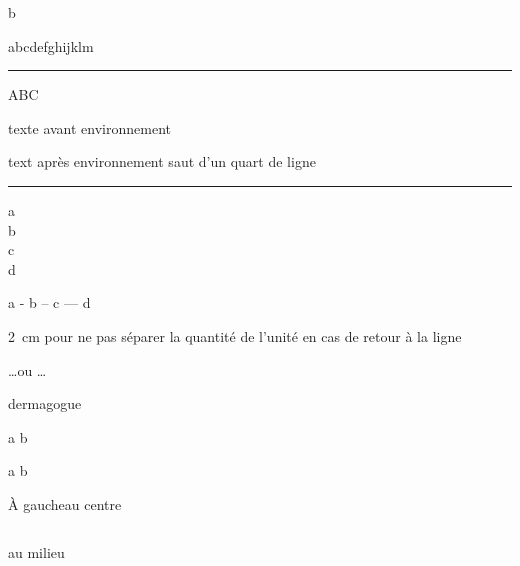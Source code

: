 \documentclass[12pt,a4paper,oneside,twocolumn]{article} %
\newlength{\Nom} %
\newcommand{\barre}[1]{
\settowidth{\Nom}{#1} #1\hspace{-\Nom} \rule[0.8ex]{\Nom}{1pt}}
\numberwithin{equation}{section}
\begin{document}

\textcircled{b}

\barre{abcdefghijklm} %



ABC

\begin{center} texte avant environnement \end{center} 
\smallskip text après environnement saut d’un quart de ligne

\rule{5cm}{1mm}

a \\ b \\[5mm] c \\[2cm] d

a - b -- c --- d

2~cm pour ne pas séparer la quantité de l'unité en cas de retour à la ligne

\ldots ou \dots

\og dermagogue  \fg

a \dotfill b

a \hfill b

À gauche\hfil au centre %
\begin{verbatim}

\end{verbatim}
\centerline{au milieu}



\end{document}
